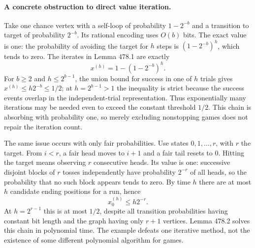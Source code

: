 \documentclass[11pt]{article}
\begin{document}
\paragraph{A concrete obstruction to direct value iteration.}
Take one chance vertex with a self-loop of probability $1-2^{-b}$ and
a transition to target of probability $2^{-b}$. Its rational encoding
uses $O(b)$ bits. The exact value is one: the probability of avoiding
the target for $h$ steps is $(1-2^{-b})^h$, which tends to zero.
The iterates in Lemma 478.1 are exactly
\begin{equation}\label{a478:rare}
                        x^{(h)}=1-(1-2^{-b})^h.
\end{equation}
For $b\geq2$ and $h\leq2^{b-1}$, the union bound for success in
one of $h$ trials gives $x^{(h)}\leq h2^{-b}\leq1/2$;
at $h=2^{b-1}>1$ the inequality is strict because the success events
overlap in the independent-trial representation. Thus exponentially many
iterations may be needed even to exceed the constant threshold $1/2$.
This chain is absorbing with probability one, so merely excluding
nonstopping games does not repair the iteration count.

The same issue occurs with only fair probabilities. Use states
$0,1,\ldots,r$, with $r$ the target. From $i<r$, a fair head moves
to $i+1$ and a fair tail resets to $0$. Hitting the target means observing
$r$ consecutive heads. Its value is one: successive disjoint blocks of
$r$ tosses independently have probability $2^{-r}$ of all heads, so
the probability that no such block appears tends to zero. By time $h$
there are at most $h$ candidate ending positions for a run, hence
\begin{equation}\label{a478:fair}
                    x^{(h)}_0\leq h2^{-r}.
\end{equation}
At $h=2^{r-1}$ this is at most $1/2$, despite all transition probabilities
having constant bit length and the graph having only $r+1$ vertices.
Lemma 478.2 solves this chain in polynomial time. The example defeats
one iterative method, not the existence of some different polynomial
algorithm for games.
\end{document}

